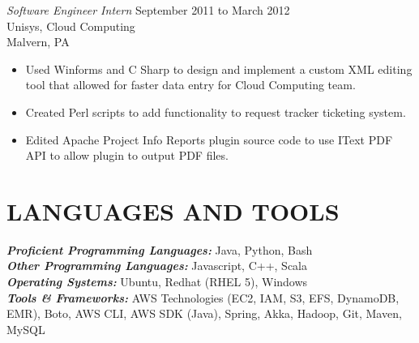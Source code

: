 \documentclass[margin]{res}
\begin{document}
\begin{resume}
                {\sl Software Engineer Intern} \hfill September 2011 to March 2012 \\
                Unisys, Cloud Computing \\
                Malvern, PA 
                \begin{itemize} \itemsep -0pt
                \item Used Winforms and C Sharp to design and implement a custom XML editing tool that allowed for faster data entry for Cloud Computing team.
                \item Created Perl scripts to add functionality to request tracker ticketing system.
                \item Edited Apache Project Info Reports plugin source code to use IText PDF API to allow plugin to output PDF files.
                \end{itemize}
\section{LANGUAGES AND TOOLS} {\sl\bf Proficient Programming Languages:} Java, Python, Bash \\
                 {\sl\bf Other Programming Languages:} Javascript, C++, Scala \\
                 {\sl\bf Operating Systems:} Ubuntu, Redhat (RHEL 5), Windows \\
                 {\sl\bf Tools \& Frameworks:} AWS Technologies (EC2, IAM, S3, EFS, DynamoDB, EMR), Boto, AWS CLI, AWS SDK (Java), Spring, Akka, Hadoop, Git, Maven, MySQL \\ 

\end{resume}
\end{document}
